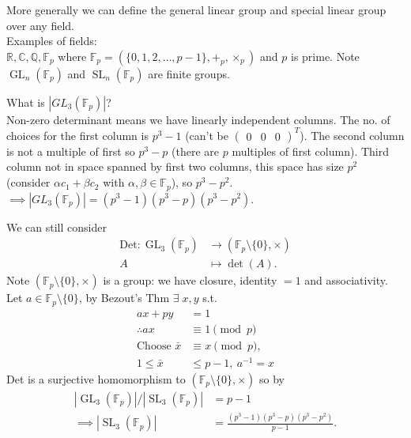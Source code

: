 \begin{remark}
    More generally we can define the general linear group and special linear group over any field. \\
    Examples of fields: \\
    $\mathbb{R}, \mathbb{C}, \mathbb{Q}, \mathbb{F}_p$ where $\mathbb{F}_p = \left( \{0, 1, 2, \ldots, p- 1\}, +_p, \times_p \right)$ and $p$ is prime.
    Note $\operatorname{GL}_n(\mathbb{F}_p)$ and $\operatorname{SL}_n(\mathbb{F}_p)$ are finite groups.
\end{remark} 

What is $|GL_3(\mathbb{F}_p)|$? \\
Non-zero determinant means we have linearly independent columns.
The no. of choices for the first column is $p^3 - 1$ (can't be $\begin{pmatrix}0 & 0 & 0\end{pmatrix}^T$).
The second column is not a multiple of first so $p^3 - p$ (there are $p$ multiples of first column).
Third column not in space spanned by first two columns, this space has size $p^2$ (consider $\alpha c_1 + \beta c_2$ with $\alpha, \beta \in \mathbb{F}_p$), so $p^3 - p^2$. \\
$\implies |GL_3(\mathbb{F}_p)| = (p^3 - 1)(p^3 - p)(p^3 - p^2)$.

We can still consider 
\begin{align*}
    \mathrm{Det} : \operatorname{GL}_3(\mathbb{F}_p) &\to (\mathbb{F}_p \setminus \{0\}, \times) \\
    A &\mapsto \det(A).
\end{align*} 
Note $(\mathbb{F}_p \setminus \{0\}, \times)$ is a group: we have closure, identity $= 1$ and associativity.
Let $a \in \mathbb{F}_p \setminus \{0\}$, by Bezout's Thm $\exists \; x, y$ s.t.
\begin{align*}
    ax + py &= 1 \\
    \therefore ax &\equiv 1 \pmod p \\
    \text{Choose } \bar{x} &\equiv x \pmod p, \\
    1 \leq \bar{x} &\leq p - 1,\ a^{-1} = x
\end{align*} 
Det is a surjective homomorphism to $(\mathbb{F}_p \setminus \{0\}, \times)$ so by 
\begin{align*}
    |\operatorname{GL}_3(\mathbb{F}_p)| / |\operatorname{SL}_3(\mathbb{F}_p)| &= p - 1 \\
    \implies |\operatorname{SL}_3(\mathbb{F}_p)| &= \frac{(p^3 - 1)(p^3 - p)(p^3 - p^2)}{p - 1}.
\end{align*} 

